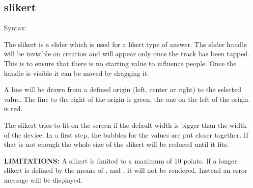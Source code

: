 \documentclass[12pt]{article} %
\begin{document}
\subsection{slikert}\label{subsec:slikert}

Syntax:\hspace{0.5cm}\kw{[@SLIKERT ... @]}

The slikert is a slider which is used for a likert type of answer.
The slider handle will be invisible on creation and will appear only once the track has been tapped.
This is to ensure that there is no starting value to influence people.
Once the handle is visible it can be moved by dragging it.

A line will be drawn from a defined origin (left, center or right) to the selected value.
The line to the right of the origin is green, the one on the left of the origin is red.

The slikert tries to fit on the screen if the default width is bigger than the width of the device.
In a first step, the bubbles for the values are put closer together.
If that is not enough the whole size of the slikert will be reduced until it fits.

\textbf{LIMITATIONS:} A slikert is limited to a maximum of 10 points.
If a longer slikert is defined by the means of ,  and , it will not be rendered.
Instead an error message will be displayed.
\end{document}

